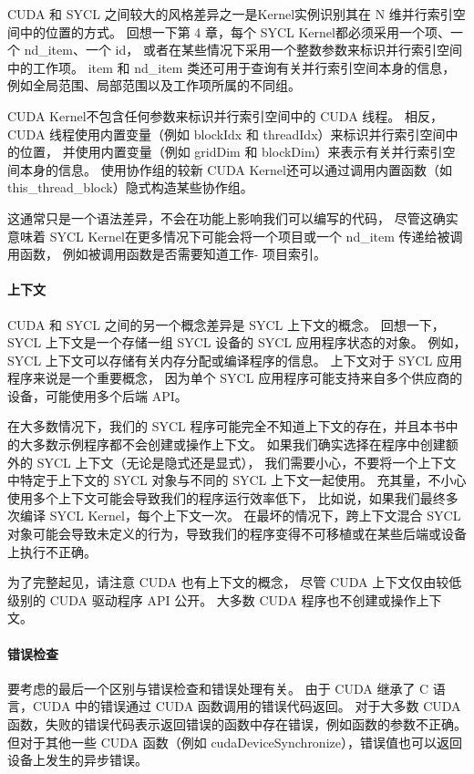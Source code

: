 CUDA 和 SYCL 之间较大的风格差异之一是Kernel实例识别其在 N 维并行索引空间中的位置的方式。 
回想一下第 4 章，每个 SYCL Kernel都必须采用一个项、一个 nd\_item、一个 id，
或者在某些情况下采用一个整数参数来标识并行索引空间中的工作项。 
item 和 nd\_item 类还可用于查询有关并行索引空间本身的信息，例如全局范围、局部范围以及工作项所属的不同组。

CUDA Kernel不包含任何参数来标识并行索引空间中的 CUDA 线程。 
相反，CUDA 线程使用内置变量（例如 blockIdx 和 threadIdx）来标识并行索引空间中的位置，
并使用内置变量（例如 gridDim 和 blockDim）来表示有关并行索引空间本身的信息。 
使用协作组的较新 CUDA Kernel还可以通过调用内置函数（如 this\_thread\_block）隐式构造某些协作组。

这通常只是一个语法差异，不会在功能上影响我们可以编写的代码，
尽管这确实意味着 SYCL Kernel在更多情况下可能会将一个项目或一个 nd\_item 传递给被调用函数，
例如被调用函数是否需要知道工作- 项目索引。

\paragraph{上下文}

CUDA 和 SYCL 之间的另一个概念差异是 SYCL 上下文的概念。 
回想一下，SYCL 上下文是一个存储一组 SYCL 设备的 SYCL 应用程序状态的对象。 
例如，SYCL 上下文可以存储有关内存分配或编译程序的信息。 上下文对于 SYCL 应用程序来说是一个重要概念，
因为单个 SYCL 应用程序可能支持来自多个供应商的设备，可能使用多个后端 API。

在大多数情况下，我们的 SYCL 程序可能完全不知道上下文的存在，并且本书中的大多数示例程序都不会创建或操作上下文。 
如果我们确实选择在程序中创建额外的 SYCL 上下文（无论是隐式还是显式），
我们需要小心，不要将一个上下文中特定于上下文的 SYCL 对象与不同的 SYCL 上下文一起使用。 
充其量，不小心使用多个上下文可能会导致我们的程序运行效率低下，
比如说，如果我们最终多次编译 SYCL Kernel，每个上下文一次。 
在最坏的情况下，跨上下文混合 SYCL 对象可能会导致未定义的行为，导致我们的程序变得不可移植或在某些后端或设备上执行不正确。

为了完整起见，请注意 CUDA 也有上下文的概念，
尽管 CUDA 上下文仅由较低级别的 CUDA 驱动程序 API 公开。 大多数 CUDA 程序也不创建或操作上下文。

\paragraph{错误检查}

要考虑的最后一个区别与错误检查和错误处理有关。 
由于 CUDA 继承了 C 语言，CUDA 中的错误通过 CUDA 函数调用的错误代码返回。 
对于大多数 CUDA 函数，失败的错误代码表示返回错误的函数中存在错误，例如函数的参数不正确。 
但对于其他一些 CUDA 函数（例如 cudaDeviceSynchronize），错误值也可以返回设备上发生的异步错误。

